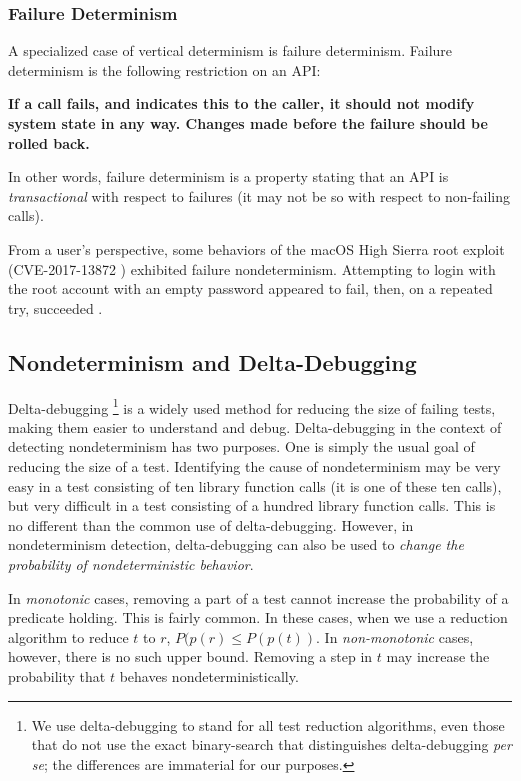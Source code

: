 \subsubsection{Failure Determinism}

A specialized case of vertical determinism is failure determinism.
Failure determinism is the following restriction on an API:

{\bf If a call fails, and indicates this to the caller, it should not modify system
  state in any way.  Changes made before the failure should be rolled
  back.} 

In other words, failure determinism is a property stating that an API
is \emph{transactional} with respect to failures (it may not be so
with respect to non-failing calls).

From a user's perspective, some behaviors of the macOS High Sierra
root exploit (CVE-2017-13872 \cite{applebug0}) exhibited failure
nondeterminism.  Attempting to login with the root account with an
empty password appeared to fail, then, on a repeated try, succeeded
\cite{applebug1,applebug2}. 

\subsection{Nondeterminism and Delta-Debugging}

Delta-debugging \cite{DD}\footnote{We use delta-debugging to stand for
  all test reduction algorithms, even those \cite{CReduce,tstl} that do not use the exact
  binary-search that distinguishes delta-debugging \emph{per se}; the
  differences are immaterial for our purposes.}  is a widely used method for reducing the
size of failing tests, making them easier to understand and debug.
Delta-debugging in the context of detecting nondeterminism has two
purposes.  One is simply the usual goal of reducing the size of a
test.  Identifying the cause of nondeterminism may be very easy in a
test consisting of ten library function calls (it is one of these ten
calls), but very difficult in a test consisting of a hundred library
function calls.  This is no different than the common use of
delta-debugging.  However, in nondeterminism detection,
delta-debugging can also be used to \emph{change the probability of
  nondeterministic behavior}.

In \emph{monotonic} cases, removing a part of a test cannot
increase the probability of a predicate holding.  This is fairly
common.  In these cases, when we use a reduction algorithm to reduce $t$
to $r$, $P(p(r) \leq P(p(t))$.  In \emph{non-monotonic} cases,
however, there is no such upper bound.  Removing a step in $t$ may
increase the probability that $t$ behaves nondeterministically.

